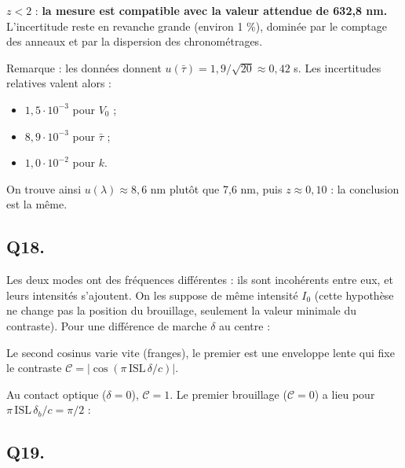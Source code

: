 \documentclass[11pt,a4paper]{article}
\providecommand{\tightlist}{\setlength{\itemsep}{0pt}\setlength{\parskip}{0pt}}
\newcommand{\equationajustee}[1]{%
  \sbox{\boiteequation}{$\displaystyle #1$}%
  \ifdim\wd\boiteequation>\linewidth
    \[\resizebox{\linewidth}{!}{\usebox{\boiteequation}}\]%
  \else
    \[#1\]%
  \fi}
\begin{document}
\(z<2\) : \textbf{la mesure est compatible avec la valeur attendue de 632,8 nm.} L'incertitude reste en revanche grande (environ 1 \%), dominée par le comptage des anneaux et par la dispersion des chronométrages.

Remarque : les données donnent \(u(\bar\tau)=1{,}9/\sqrt{20}\approx0{,}42\) s. Les incertitudes relatives valent alors :

\begin{itemize}
\tightlist
\item
  \(1{,}5\cdot10^{-3}\) pour \(V_0\) ;
\item
  \(8{,}9\cdot10^{-3}\) pour \(\bar\tau\) ;
\item
  \(1{,}0\cdot10^{-2}\) pour \(k\).
\end{itemize}

On trouve ainsi \(u(\lambda)\approx8{,}6\) nm plutôt que 7,6 nm, puis \(z\approx0{,}10\) : la conclusion est la même.

\hypertarget{q18.}{%
\subsection{Q18.}\label{q18.}}

Les deux modes ont des fréquences différentes : ils sont incohérents entre eux, et leurs intensités s'ajoutent. On les suppose de même intensité \(I_0\) (cette hypothèse ne change pas la position du brouillage, seulement la valeur minimale du contraste). Pour une différence de marche \(\delta\) au centre :

\equationajustee{\begin{aligned}
I(\delta)&=2I_0\left[2+\cos\frac{2\pi\nu_1\delta}{c}+\cos\frac{2\pi\nu_2\delta}{c}\right]\\
&=4I_0\left[1+\cos\left(\frac{\pi\,\mathrm{ISL}\,\delta}{c}\right)\cos\left(\frac{\pi(\nu_1+\nu_2)\delta}{c}\right)\right]
\end{aligned}}

Le second cosinus varie vite (franges), le premier est une enveloppe lente qui fixe le contraste \(\mathcal C=\left|\cos\left(\pi\,\mathrm{ISL}\,\delta/c\right)\right|\).

Au contact optique (\(\delta=0\)), \(\mathcal C=1\). Le premier brouillage (\(\mathcal C=0\)) a lieu pour \(\pi\,\mathrm{ISL}\,\delta_b/c=\pi/2\) :

\equationajustee{\boxed{\delta_b=\frac{c}{2\,\mathrm{ISL}}}}

\hypertarget{q19.}{%
\subsection{Q19.}\label{q19.}}
\end{document}
